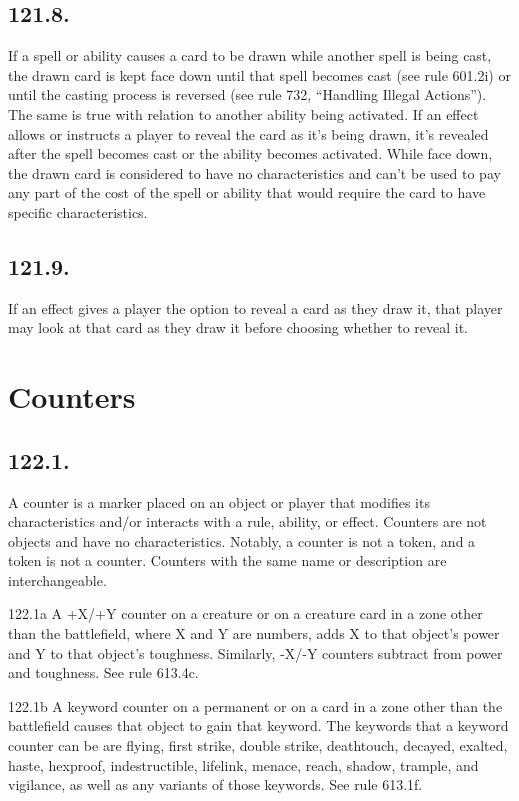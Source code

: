 \subsection*{121.8.}
If a spell or ability causes a card to be drawn while another spell is being cast, the drawn card is kept face down until that spell becomes cast (see rule 601.2i) or until the casting process is reversed (see rule 732, “Handling Illegal Actions”). The same is true with relation to another ability being activated. If an effect allows or instructs a player to reveal the card as it’s being drawn, it’s revealed after the spell becomes cast or the ability becomes activated. While face down, the drawn card is considered to have no characteristics and can’t be used to pay any part of the cost of the spell or ability that would require the card to have specific characteristics.

\subsection*{121.9.}
If an effect gives a player the option to reveal a card as they draw it, that player may look at that card as they draw it before choosing whether to reveal it.

\section{Counters}
\subsection*{122.1.}
A counter is a marker placed on an object or player that modifies its characteristics and/or interacts with a rule, ability, or effect. Counters are not objects and have no characteristics. Notably, a counter is not a token, and a token is not a counter. Counters with the same name or description are interchangeable.

122.1a A +X/+Y counter on a creature or on a creature card in a zone other than the battlefield, where X and Y are numbers, adds X to that object’s power and Y to that object’s toughness. Similarly, -X/-Y counters subtract from power and toughness. See rule 613.4c.

122.1b A keyword counter on a permanent or on a card in a zone other than the battlefield causes that object to gain that keyword. The keywords that a keyword counter can be are flying, first strike, double strike, deathtouch, decayed, exalted, haste, hexproof, indestructible, lifelink, menace, reach, shadow, trample, and vigilance, as well as any variants of those keywords. See rule 613.1f.

